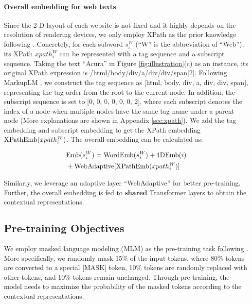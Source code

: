 \documentclass[11pt]{article}
\begin{document}
\paragraph{Overall embedding for web texts} Since the 2-D layout of each website is not fixed and it highly depends on the resolution of rendering devices, we only employ XPath as the prior knowledge following \cite{li2021markuplm}. Concretely, for each subword $s_{i}^{W}$ (``W'' is the abbreviation of ``Web''), its XPath $xpath_{i}^{W}$ can be represented with a tag sequence and a subscript sequence. Taking the text ``Acura'' in Figure \ref{fig:illustration}(c) as an instance, its original XPath expression is /html/body/div/a/div/div/span[2]. Following MarkupLM \cite{li2021markuplm}, we construct the tag sequence as [html, body, div, a, div, div, span], representing the tag order from the root to the current node. In addition, the subscript sequence is set to [0, 0, 0, 0, 0, 0, 2], where each subscript denotes the index of a node when multiple nodes have the same tag name under a parent node (More explanations are shown in Appendix \ref{sec:xpath}). We add the tag embedding and subscript embedding to get the XPath embedding ${\rm XPathEmb}(xpath_{i}^{W})$. The overall embedding can be calculated as:



\begin{equation}
\begin{aligned}
& {\rm Emb}(s_{i}^{W}) = {\rm WordEmb}(s_{i}^{W}) + {\rm 1DEmb}(i) \\ 
& + {\rm WebAdaptive}[{\rm XPathEmb}(xpath_{i}^{W})]
\end{aligned}
\label{eq:web}
\end{equation}





Similarly, we leverage an adaptive layer ``WebAdaptive'' for better pre-training. Further, the overall embedding is fed to \textbf{shared} Transformer layers to obtain the contextual representations. 

\subsection{Pre-training Objectives}

We employ masked language modeling (MLM) as the pre-training task following \cite{devlin2018bert,liu2019roberta,xu2020layoutlm}. More specifically, we randomly mask 15\% of the input tokens, where 80\% tokens are converted to a special [MASK] token, 10\% tokens are randomly replaced with other tokens, and 10\% tokens remain unchanged. Through pre-training, the model needs to maximize the probability of the masked tokens according to the contextual representations.
\end{document}
